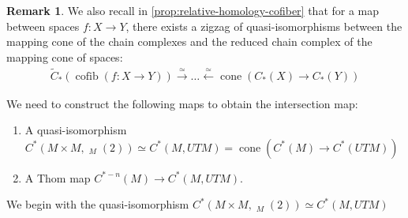 \documentclass{scrartcl}
\theoremstyle{plain}
\theoremstyle{definition}
\newtheorem{remark}[theorem]{Remark}
\DeclareMathOperator{\cone}{cone}
\DeclareMathOperator{\cofib}{cofib}
\newcommand{\quiso}{\simeq}
\let\xto\xrightarrow
\let\xfrom\xleftarrow
\DeclareMathOperator{\cConf}{\overline{Conf}}
\begin{document}
\begin{remark}\label{rmk:cofib-cone}
    We also recall in \cref{prop:relative-homology-cofiber} that for a map between spaces $f\colon X\to Y$, there exists a zigzag of quasi-isomorphisms between the mapping cone of the chain complexes and the reduced chain complex of the mapping cone of spaces:
    \begin{align*}
        \tilde C_*(\cofib(f\colon X\to Y))\xto{\quiso} \dots\xfrom{\quiso} \cone(C_*(X)\to C_*(Y))
    \end{align*}
\end{remark}

We need to construct the following maps to obtain the intersection map:
\begin{enumerate}[(1)]
    \item A quasi-isomorphism $C^*(M\times M, \cConf_M(2))\quiso C^*(M, UTM) = \cone(C^*(M)\to C^*(UTM))$
    \item A Thom map $C^{*-n}(M)\to C^*(M, UTM)$.
\end{enumerate}
We begin with the quasi-isomorphism $C^*(M\times M, \cConf_M(2))\quiso C^*(M, UTM)$
\end{document}
